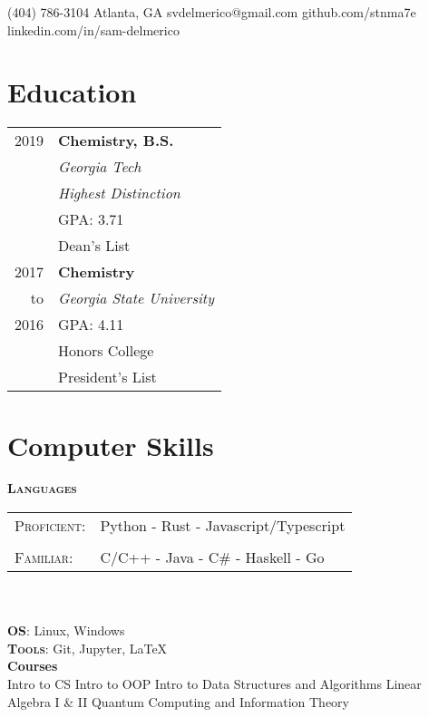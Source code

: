 \documentclass{tccv}
\begin{document}
\small

    {(404) 786-3104}
    {Atlanta, GA}
    {}
    {svdelmerico@gmail.com}
    {github.com/stnma7e}
    {linkedin.com/in/sam-delmerico}

\begin{minipage}[t]{0.35\textwidth}
    \section{Education}
    \begin{tabular}{rl}
        2019 & \textbf{Chemistry, B.S.} \\
             & \emph{Georgia Tech} \\
             & \emph{Highest Distinction} \\
             & GPA: 3.71 \\
             & Dean's List \\
        
        2017 & \textbf{Chemistry} \\
        to   & \emph{Georgia State University} \\
        2016 & GPA: 4.11 \\
             & Honors College \\
             & President's List
    \end{tabular}

    \section{Computer Skills}
    \textbf{\textsc{Languages}}
  
    \begin{tabulary}{\linewidth}{lL}
        \textsc{Proficient:} & Python - Rust - Javascript/Typescript \\
        \\
        \textsc{Familiar:} &  C/C++ - Java - C\# - Haskell - Go
    \end{tabulary}
    \\\\
    
    \textbf{\textsc{OS}}:
        Linux, Windows \\
   
    \textbf{\textsc{Tools}}:
        Git, Jupyter, \LaTeX{} \\
    
    \textbf{Courses} \\
        Intro to CS \newline
        Intro to OOP \newline
        Intro to Data Structures and Algorithms \newline
        Linear Algebra I \& II \newline
        Quantum Computing and Information Theory
        

\end{minipage}
\end{document}
